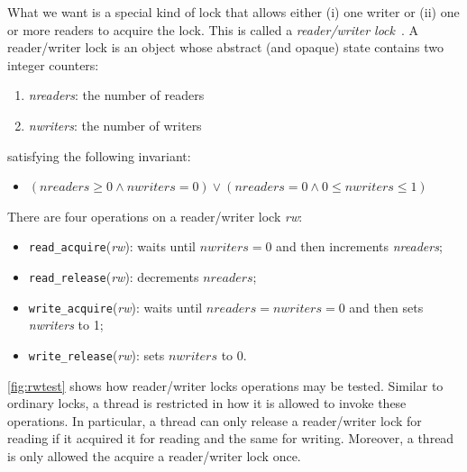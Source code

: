 \documentclass{report}
\begin{document}
What we want is a special kind of lock that allows either (i) one writer
or (ii) one or more readers to acquire the lock.  This is called
a \emph{reader/writer lock}~\cite{CHP71}.
%
A reader/writer lock is an object whose abstract (and opaque)
state contains two integer counters:
\begin{enumerate}
\item \textit{nreaders}: the number of readers
\item \textit{nwriters}: the number of writers
\end{enumerate}
satisfying the following invariant:
\begin{itemize}
\item [] $(\mathit{nreaders} \ge 0 \land \mathit{nwriters} = 0) \lor
    (\mathit{nreaders} = 0 \land 0 \le \mathit{nwriters} \le 1)$
\end{itemize}

There are four operations on a reader/writer lock \textit{rw}:
\begin{itemize}
\item \texttt{read\_acquire}(\textit{rw}): waits until $\mathit{nwriters} = 0$
and then increments \textit{nreaders};
\item \texttt{read\_release}(\textit{rw}): decrements $\mathit{nreaders}$;
\item \texttt{write\_acquire}(\textit{rw}): waits until
$\mathit{nreaders} = \mathit{nwriters} = 0$
and then sets \textit{nwriters} to 1;
\item \texttt{write\_release}(\textit{rw}): sets $\mathit{nwriters}$ to 0.
\end{itemize}

\autoref{fig:rwtest} shows how reader/writer locks operations
may be tested.
Similar to ordinary locks, a thread is restricted in how it is allowed to
invoke these operations.
In particular, a thread can only release a reader/writer lock for reading
if it acquired it for reading and the same for writing.
Moreover, a thread is only allowed the acquire a reader/writer lock once.
\end{document}
